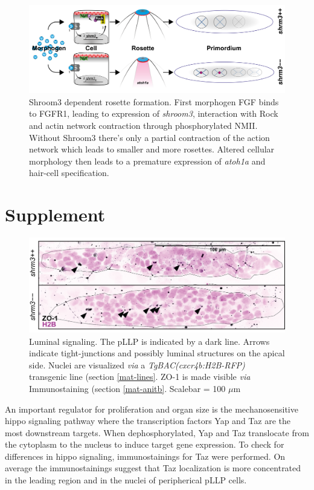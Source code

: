 \documentclass[11pt,singlespacinge,twoside]{reedthesis} %
\theoremstyle{definition}
\theoremstyle{definition}
\theoremstyle{definition}
\theoremstyle{remark}
\begin{document}
\begin{figure}[H]

{\centering \includegraphics[width=0.95\linewidth]{figures/summary/CurrentModel_new-01} 

}

\caption[Shroom3 dependent rosette formation]{Shroom3 dependent rosette formation. First morphogen FGF binds to FGFR1, leading to expression of \emph{shroom3}, interaction with Rock and actin network contraction through phosphorylated NMII. Without Shroom3 there's only a partial contraction of the action network which leads to smaller and more rosettes. Altered cellular morphology then leads to a premature expression of \emph{atoh1a} and hair-cell specification.}\label{fig:summodel}
\end{figure}
\appendix

\hypertarget{supplement}{%
\chapter*{Supplement}\label{supplement}}


\begin{figure}[h]

{\centering \includegraphics[width=0.7\linewidth,]{figures/supp/zo1} 

}

\caption[Luminal signaling]{Luminal signaling. The pLLP is indicated by a dark line. Arrows indicate tight-junctions and possibly luminal structures on the apical side. Nuclei are visualized \emph{via} a \emph{TgBAC(cxcr4b:H2B-RFP)} transgenic line (section \ref{mat-lines}. ZO-1 is made visible \emph{via} Immunostaining (section \ref{mat-anitb}. Scalebar = 100 \(\mu\)m}\label{fig:suppzo1}
\end{figure}
An important regulator for proliferation and organ size is the mechanosensitive hippo signaling pathway where the transcription factors Yap and Taz are the most downstream targets. When dephosphorylated, Yap and Taz translocate from the cytoplasm to the nucleus to induce target gene expression.
To check for differences in hippo signaling, immunostainings for Taz were performed. On average the immunostainings suggest that Taz localization is more concentrated in the leading region and in the nuclei of peripherical pLLP cells.
\end{document}

